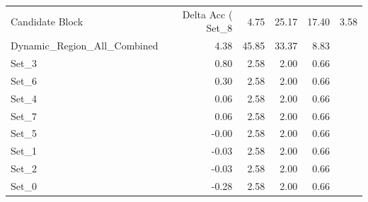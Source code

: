 \begin{tabular}{lrrrr}
\toprule
Candidate Block & Delta Acc (%
\midrule
Set_8 & 4.75 & 25.17 & 17.40 & 3.58 \\
Dynamic_Region_All_Combined & 4.38 & 45.85 & 33.37 & 8.83 \\
Set_3 & 0.80 & 2.58 & 2.00 & 0.66 \\
Set_6 & 0.30 & 2.58 & 2.00 & 0.66 \\
Set_4 & 0.06 & 2.58 & 2.00 & 0.66 \\
Set_7 & 0.06 & 2.58 & 2.00 & 0.66 \\
Set_5 & -0.00 & 2.58 & 2.00 & 0.66 \\
Set_1 & -0.03 & 2.58 & 2.00 & 0.66 \\
Set_2 & -0.03 & 2.58 & 2.00 & 0.66 \\
Set_0 & -0.28 & 2.58 & 2.00 & 0.66 \\
\bottomrule
\end{tabular}
